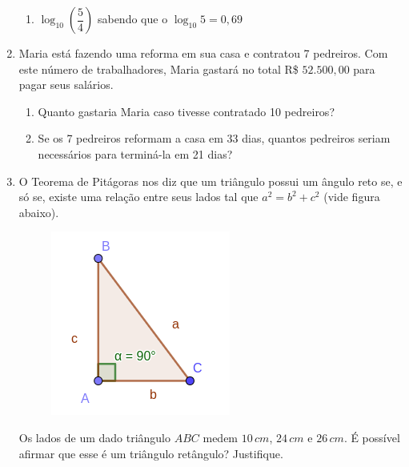 \documentclass[a4paper, 12pt]{article}
\newcommand{\PC}[1]{\ensuremath{\left(#1\right)}}
\begin{document}
\begin{enumerate}
\begin{enumerate}
    		\item $\log_{10} \PC{ \dfrac{5}{4} }$ sabendo que o $\log_{10} 5 = 0,69$
\end{enumerate} 
\vspace{0.7cm}





	\item Maria está fazendo uma reforma em sua casa e contratou 7 pedreiros. Com este número de trabalhadores, Maria gastará no total R\$ $52.500,00$ para pagar seus salários.
	\begin{enumerate}	
    	\item Quanto gastaria Maria caso tivesse contratado 10 pedreiros?
    	\item Se os 7 pedreiros reformam a casa em 33 dias, quantos pedreiros seriam necessários para terminá-la em 21 dias?
	\end{enumerate}
\pagebreak
 
 
 
	\item O Teorema de Pitágoras nos diz que um triângulo possui um ângulo reto se, e só se, existe uma relação entre seus lados tal que $a^2 = b^2 + c^2$ (vide figura abaixo).
		
		\begin{figure}[h]
		\centering
		\includegraphics[scale = 0.60]{triangulo}
		\end{figure}
		
	 Os lados de um dado triângulo $ABC$ medem $10 \, cm$, $24 \, cm$ e $26 \, cm$. É possível afirmar que esse é um triângulo retângulo? Justifique.
\vspace{0.7cm}



\end{enumerate}
\end{document}
